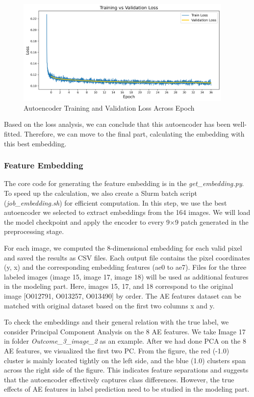 \documentclass[10pt,letterpaper]{article}
\begin{document}
\begin{figure}[H]
    \centering
    \includegraphics[width=0.95\textwidth]{loss_plot.png}
    \caption{Autoencoder Training and Validation Loss Across Epoch}
    \label{Figure 7}
\end{figure}

Based on the loss analysis, we can conclude that this autoencoder has been well-fitted. Therefore, we can move to the final part, calculating the embedding with this best embedding.



\subsubsection{Feature Embedding}


The core code for generating the feature embedding is in the \textit{get\_embedding.py}. To speed up the calculation, we also create a Slurm batch script (\textit{job\_embedding.sh}) for efficient computation. In this step, we use the best autoencoder we selected to extract embeddings from the 164 images. We will load the model checkpoint and apply the encoder to every 9×9 patch generated in the preprocessing stage.

For each image, we computed the 8-dimensional embedding for each valid pixel and saved the results as CSV files. Each output file contains the pixel coordinates (y, x) and the corresponding embedding features (ae0 to ae7). Files for the three labeled images (image 15, image 17, image 18) will be used as additional features in the modeling part. Here, images 15, 17, and 18 correspond to the original image [O012791, O013257, O013490] by order. The AE features dataset can be matched with original dataset based on the first two columns x and y.

To check the embeddings and their general relation with the true label, we consider Principal Component Analysis on the 8 AE features. We take Image 17 in folder \textit{Outcome\_3\_image\_2} as an example. After we had done PCA on the 8 AE features, we visualized the first two PC. From the figure, the red (-1.0) cluster is mainly located tightly on the left side, and the blue (1.0) clusters span across the right side of the figure. This indicates feature separations and suggests that the autoencoder effectively captures class differences. However, the true effects of AE features in label prediction need to be studied in the modeling part.
\end{document}
